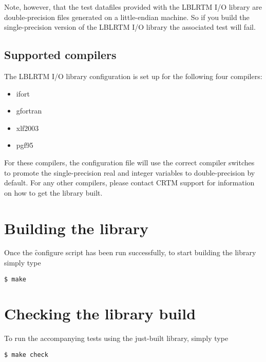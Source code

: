 Note, however, that the test datafiles provided with the LBLRTM I/O library are double-precision files generated on a little-endian machine. So if you build the single-precision version of the LBLRTM I/O library the associated test will fail.


\subsection{Supported compilers}

The LBLRTM I/O library configuration is set up for the following four compilers:
\begin{itemize}
  \item ifort
  \item gfortran
  \item xlf2003
  \item pgf95
\end{itemize}

For these compilers, the configuration file will use the correct compiler switches to promote the single-precision real and integer variables to double-precision by default. For any other compilers, please contact CRTM support for information on how to get the library built.



\section{Building the library}

Once the \f{configure} script has been run successfully, to start building the library simply type

\begin{verbatim}$ make\end{verbatim}



\section{Checking the library build}

To run the accompanying tests using the just-built library, simply type

\begin{verbatim}$ make check\end{verbatim}

